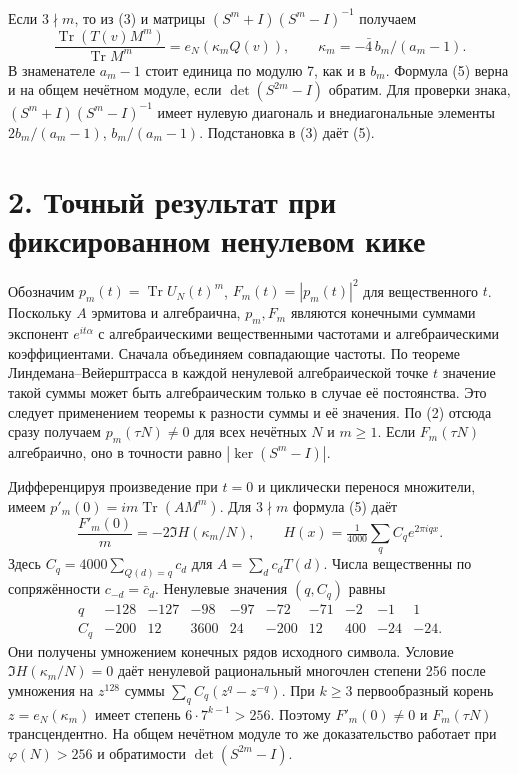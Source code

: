 \documentclass[11pt,a4paper]{article}
\newcommand{\Tr}{\operatorname{Tr}}
\newcommand{\sect}[1]{\section*{\sffamily\color{ink}#1}}
\begin{document}
Если $3\nmid m$, то из (3) и матрицы $(S^m+I)(S^m-I)^{-1}$ получаем
\[
     \frac{\Tr(T(v)M^m)}{\Tr M^m}=e_N(\kappa_m Q(v)),\qquad
     \kappa_m=-\bar4\,b_m/(a_m-1).                                  \tag{5}
\]
В знаменателе $a_m-1$ стоит единица по модулю 7, как и в $b_m$. Формула (5) верна и на общем нечётном модуле, если $\det(S^{2m}-I)$ обратим. Для проверки знака,
$(S^m+I)(S^m-I)^{-1}$ имеет нулевую диагональ и внедиагональные элементы $2b_m/(a_m-1)$, $b_m/(a_m-1)$. Подстановка в (3) даёт (5).
\newpage
\sect{2. Точный результат при фиксированном ненулевом кике}
Обозначим $p_m(t)=\Tr U_N(t)^m$, $F_m(t)=|p_m(t)|^2$ для вещественного $t$. Поскольку $A$ эрмитова и алгебраична, $p_m,F_m$ являются конечными суммами экспонент $e^{it\alpha}$ с алгебраическими вещественными частотами и алгебраическими коэффициентами. Сначала объединяем совпадающие частоты. По теореме Линдемана--Вейерштрасса в каждой ненулевой алгебраической точке $t$ значение такой суммы может быть алгебраическим только в случае её постоянства. Это следует применением теоремы к разности суммы и её значения. По (2) отсюда сразу получаем $p_m(\tau N)\ne0$ для всех нечётных $N$ и $m\ge1$. Если $F_m(\tau N)$ алгебраично, оно в точности равно $|\ker(S^m-I)|$.

Дифференцируя произведение при $t=0$ и циклически перенося множители, имеем $p'_m(0)=im\Tr(A M^m)$. Для $3\nmid m$ формула (5) даёт
\[
      \frac{F'_m(0)}m=-2\Im H(\kappa_m/N),\qquad
      H(x)=\tfrac1{4000}\sum_q C_q e^{2\pi i q x}.
                                                                     \tag{6}
\]
Здесь $C_q=4000\sum_{Q(d)=q}c_d$ для $A=\sum_d c_dT(d)$. Числа вещественны по сопряжённости $c_{-d}=\bar c_d$. Ненулевые значения $(q,C_q)$ равны
\[
\begin{array}{c|rrrrrrrrr}
q&-128&-127&-98&-97&-72&-71&-2&-1&1\\\hline
C_q&-200&12&3600&24&-200&12&400&-24&-24 .
\end{array}
\]
Они получены умножением конечных рядов исходного символа. Условие $\Im H(\kappa_m/N)=0$ даёт ненулевой рациональный многочлен степени 256 после умножения на $z^{128}$ суммы $\sum_q C_q(z^q-z^{-q})$. При $k\ge3$ первообразный корень $z=e_N(\kappa_m)$ имеет степень $6\cdot7^{k-1}>256$. Поэтому $F'_m(0)\ne0$ и $F_m(\tau N)$ трансцендентно. На общем нечётном модуле то же доказательство работает при $\varphi(N)>256$ и обратимости $\det(S^{2m}-I)$.
\end{document}
